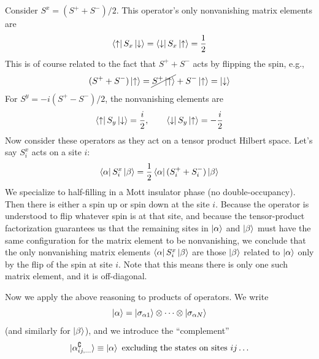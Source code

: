 \documentclass{report}
\begin{document}
Consider $ S^x = (S^+ + S^-)/2$. This operator's only nonvanishing matrix elements 
are 
\begin{equation*}
	\bra{\uparrow} S_x \ket{\downarrow} = 
	\bra{\downarrow} S_x \ket{\uparrow} = \frac{1}{2}
\end{equation*}
This is of course related to the fact that $ S^+ + S^- $ acts by flipping the spin, e.g.,
\begin{equation*}
	(S^+ + S^-)\ket{\uparrow} = \cancel{S^+\ket{\uparrow}}
		+ S^- \ket{\uparrow} = \ket{\downarrow} 
\end{equation*}
For $ S^y = - i (S^+ - S^-) / 2 $, the nonvanishing elements are
\begin{equation*}
	\bra{\uparrow} S_y \ket{\downarrow} = \frac{i}{2},\qquad
	\bra{\downarrow} S_y \ket{\uparrow} = -\frac{i}{2}
\end{equation*}
Now consider these operators as they act on a tensor product Hilbert space.
Let's say $ S_i^x $ acts on a site $ i $:
\begin{equation*}
	\bra{\alpha} S_i^x \ket{\beta}
		= \frac{1}{2}\bra{\alpha} (S^+_i + S^-_i) \ket{\beta}
\end{equation*}
We specialize to half-filling in a Mott insulator phase (no double-occupancy). 
Then there is either a spin up or spin down at the site $ i $. Because 
the operator is understood to flip whatever spin is at that site, and because 
the tensor-product factorization guarantees us that the remaining sites 
in $ \ket{\alpha} $ and $ \ket{\beta} $ must have the same configuration for the
matrix element to be nonvanishing, we conclude that the only nonvanishing matrix
elements $ \bra{\alpha} S_i^x\ket{\beta} $ are those $ \ket{\beta} $ related to 
$ \ket{\alpha} $ only by the flip of the spin at site $ i $. Note that this 
means there is only one such matrix element, and it is off-diagonal.

Now we apply the above reasoning to products of operators. We write 
\begin{equation*}
	\ket{\alpha} = \ket{\sigma_{\alpha 1}}\otimes \cdots \otimes 
			\ket{\sigma_{\alpha N}}
\end{equation*}
(and similarly for $ \ket{\beta} $), and we introduce the ``complement''
\begin{equation*}
\ket*{\alpha_{ij,\dots}^\complement} \equiv \ket{\alpha}\text{ excluding the 
   states on sites }ij\dots
\end{equation*}
\end{document}
